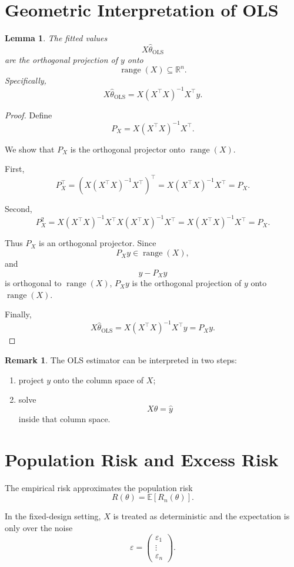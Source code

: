 \documentclass[12pt,oneside]{book}
\numberwithin{equation}{section}
\theoremstyle{definition}
\newtheorem{remark}{Remark}[section]
\theoremstyle{plain}
\newtheorem{lemma}{Lemma}[section]
\theoremstyle{remark}
\newcommand{\R}{\mathbb{R}}
\newcommand{\E}{\mathbb{E}}
\begin{document}
\section{Geometric Interpretation of OLS}

\begin{lemma}
The fitted values
\[
X\widehat{\theta}_{\mathrm{OLS}}
\]
are the orthogonal projection of $y$ onto
\[
\operatorname{range}(X)\subseteq\R^n.
\]
Specifically,
\[
X\widehat{\theta}_{\mathrm{OLS}}
=
X(X^\top X)^{-1}X^\top y.
\]
\end{lemma}

\begin{proof}
Define
\[
P_X
=
X(X^\top X)^{-1}X^\top.
\]

We show that $P_X$ is the orthogonal projector onto $\operatorname{range}(X)$.

First,
\[
P_X^\top
=
\left(
X(X^\top X)^{-1}X^\top
\right)^\top
=
X(X^\top X)^{-1}X^\top
=
P_X.
\]

Second,
\[
P_X^2
=
X(X^\top X)^{-1}X^\top
X(X^\top X)^{-1}X^\top
=
X(X^\top X)^{-1}X^\top
=
P_X.
\]

Thus $P_X$ is an orthogonal projector. Since
\[
P_Xy\in\operatorname{range}(X),
\]
and
\[
y-P_Xy
\]
is orthogonal to $\operatorname{range}(X)$, $P_Xy$ is the orthogonal projection of $y$ onto $\operatorname{range}(X)$.

Finally,
\[
X\widehat{\theta}_{\mathrm{OLS}}
=
X(X^\top X)^{-1}X^\top y
=
P_Xy.
\]
\end{proof}

\begin{remark}
The OLS estimator can be interpreted in two steps:
\begin{enumerate}
\item project $y$ onto the column space of $X$;
\item solve
\[
X\theta=\widehat{y}
\]
inside that column space.
\end{enumerate}
\end{remark}

\section{Population Risk and Excess Risk}

The empirical risk approximates the population risk
\[
R(\theta)
=
\E[R_n(\theta)].
\]

In the fixed-design setting, $X$ is treated as deterministic and the expectation is only over the noise
\[
\varepsilon=
\begin{pmatrix}
\varepsilon_1\\
\vdots\\
\varepsilon_n
\end{pmatrix}.
\]
\end{document}
